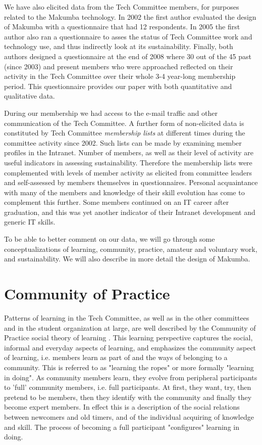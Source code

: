 \documentclass{acm_proc_article-sp}
\begin{document}
We have also elicited data from the Tech Committee members, for purposes related to the Makumba technology. In 2002 the first author evaluated the design of Makumba with a questionnaire that had 12 respondents. In 2005 the first author also ran a questionnaire
to asses the status of Tech Committee work and technology use, and thus indirectly look at its sustainability. Finally, both authors designed a questionnaire at the end of 2008 where 30 out of the 45 past (since 2003) and present members who were approached reflected on their activity in the Tech Committee over their whole 3-4 year-long membership period. This questionnaire provides our paper with both quantitative and qualitative data. 

During our membership we had access to the e-mail traffic and other communication of the Tech Committee. A further form of non-elicited data is constituted by Tech Committee {\it membership lists} at different times during the committee activity since 2002. Such lists can be made by examining member profiles in the Intranet. Number of members, as well as their level of activity are useful indicators in assessing sustainability. Therefore the membership lists were complemented with levels of member activity as elicited from committee leaders and self-assessed by members themselves in questionnaires. Personal acquaintance with many of the members and knowledge of their skill evolution has come to complement this further. Some members continued on an IT career after graduation, and this was yet another indicator of their Intranet development and generic IT skills. 

To be able to better comment on our data, we will go through some conceptualizations of learning, community, practice, amateur and voluntary work, and sustainability. We will also describe in more detail the design of Makumba.

\section{Community of Practice}\label{sec:cop}
Patterns of learning in the Tech Committee, as well as in the other committees and in the student organization at large, are well described by the Community of Practice social theory of learning  \cite{lave_wenger91, wenger98}. This learning perspective captures the social, informal and everyday aspects of learning, and emphasizes the community aspect of learning, i.e. members learn as part of and the ways of belonging to a community. This is referred to as "learning the ropes" or more formally "learning in doing".  As community members learn, they evolve from peripheral participants to 'full' community members, i.e. full participants. At first, they want, try, then pretend to be members, then they identify with the community and finally they become expert members. 
In effect this is a description of the social relations between newcomers and old timers, and of the individual acquiring of knowledge and skill. The process of becoming a full participant "configures" learning in doing.
\end{document}
